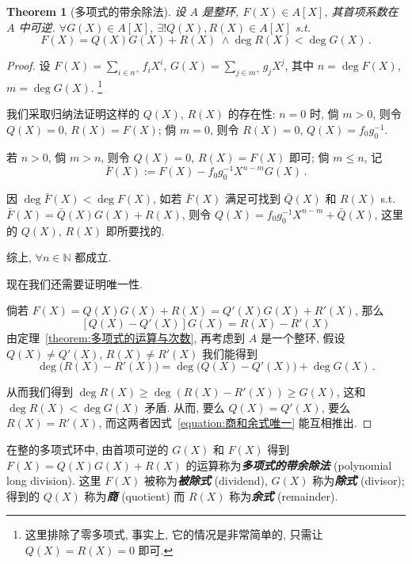 \documentclass[openany]{ctexbook}
\newcommand*{\indexbf}[1]{\emph{\textbf{#1}}\index{#1}} %
\theoremstyle{plain}
\newtheorem{theorem}{Theorem}[section] %
\theoremstyle{definition}
\begin{document}
\begin{theorem}[多项式的带余除法]\label{theorem:多项式的带余除法}
	设 $A$ 是整环, $F(X) \in A[X]$, 其首项系数在 $A$ 中可逆. 
	$\forall G(X) \in A[X]$, $\exists! Q(X), R(X) \in A[X]$ s.t.\ 
	\begin{equation*}
		F(X) = Q(X) G(X) + R(X)\; \wedge \deg R(X) < \deg G(X)\,.
	\end{equation*}
\end{theorem}
\begin{proof}
	设 $F(X) = \sum_{i \in n^+} f_i X^i$, $G(X) = \sum_{j \in m^+} g_j X^j$, 其中 $n = \deg F(X)$, $m = \deg G(X)$. \footnote{这里排除了零多项式, 事实上, 它的情况是非常简单的, 只需让 $Q(X) = R(X) = 0$ 即可.} 

	我们采取归纳法证明这样的 $Q(X)$, $R(X)$ 的存在性:
	$n = 0$ 时, 倘 $m > 0$, 则令 $Q(X) = 0$, $R(X) = F(X)$; 
	倘 $m = 0$, 则令 $R(X) = 0$, $Q(X) = f_0 g_0^{-1}$.

	若 $n > 0$, 倘 $m > n$, 则令 $Q(X) = 0$, $R(X) = F(X)$ 即可;
	倘 $m \leq n$, 记
	\begin{equation*}
		\bar F(X) := F(X) - f_0 g_0^{-1} X^{n - m} G(X)\,.
	\end{equation*}

	因 $\deg \bar F(X) < \deg F(X)$, 如若 $\bar F(X)$ 满足可找到 $\bar Q(X)$ 和 $R(X)$ s.t.\ $\bar F(X) = \bar Q(X) G(X) + R(X)$, 则令 $Q(X) = f_0 g_0^{-1} X^{n - m} + \bar Q(X)$, 这里的 $Q(X)$, $R(X)$ 即所要找的.

	综上, $\forall n \in \mathbb N$ 都成立.

	现在我们还需要证明唯一性.

	倘若 $F(X) = Q(X) G(X) + R(X) = Q'(X) G(X) + R'(X)$, 那么
	\begin{equation}\label{equation:商和余式唯一}
		[Q(X) - Q'(X)] G(X) = R(X) - R'(X)
	\end{equation}
	由定理~\ref{theorem:多项式的运算与次数}, 再考虑到 $A$ 是一个整环, 假设 $Q(X) \neq Q'(X)$, $R(X) \neq R'(X)$ 我们能得到
	\begin{equation*}
		\deg \big(R(X) - R'(X)\big) = \deg \big( Q(X) - Q'(X)\big) + \deg G(X)\,.
	\end{equation*}

	从而我们得到 $\deg R(X) \geq \deg(R(X) - R'(X)) \geq G(X)$, 这和 $\deg R(X) < \deg G(X)$ 矛盾. 从而, 要么 $Q(X) = Q'(X)$, 要么 $R(X) = R'(X)$, 而这两者因式~\ref{equation:商和余式唯一} 能互相推出.
\end{proof}

在整的多项式环中, 由首项可逆的 $G(X)$ 和 $F(X)$ 得到 $F(X) = Q(X) G(X) + R(X)$ 的运算称为\indexbf{多项式的带余除法} (polynomial long division). 
这里 $F(X)$ 被称为\indexbf{被除式} (dividend), $G(X)$ 称为\indexbf{除式} (divisor); 得到的 $Q(X)$ 称为\indexbf{商} (quotient) 而 $R(X)$ 称为\indexbf{余式} (remainder).
\end{document}
